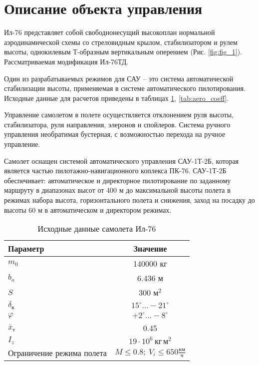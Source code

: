 \section{Описание объекта управления}

Ил-76 представляет собой свободнонесущий высокоплан нормальной аэродинамической
схемы со стреловидным крылом, стабилизатором и рулем высоты, однокилевым
Т-образным вертикальным оперением (Рис. \ref{fig:fig_1}). Рассматриваемая
модификация Ил-76ТД.

Один из разрабатываемых режимов для САУ -- это система автоматической
стабилизации высоты, применяемая в системе автоматического пилотирования.
Исходные данные для расчетов приведены в таблицах \ref{tab:data},
\ref{tab:aero_coeff}. 

Управление самолетом в полете осуществляется отклонением руля высоты,
стабилизатора, руля направления, элеронов и спойлеров. Система ручного
управления необратимая бустерная, с возможностью перехода на ручное управление. 

Самолет оснащен системой автоматического управления САУ-1Т-2Б, которая является
частью пилотажно-навигационного коплекса ПК-76. САУ-1Т-2Б обеспечивает:
автоматическое и директорное пилотирование по заданному маршруту в диапазонах
высот от 400 м до максимальной высоты полета в режимах набора высота,
горизонтального полета и снижения, заход на посадку до высоты 60 м в
автоматическом и директором режимах.

\begin{sidewaysfigure}
    \centering
    \caption{Общий вид самолета Ил-76}
    \label{fig:fig_1}
\end{sidewaysfigure}

\begin{table}[H]
    \centering
    \caption{Исходные данные самолета Ил-76}
    \label{tab:data}
    \begin{tabular}{|p{}|c|}
        \hline
        Параметр & Значение \\ 
        \hline
        $m_0$ & 140000 кг\\
        \hline
        $b_a$ & 6.436 м \\
        \hline
        $S$ & 300 $\text{м}^2$ \\
        \hline
        $ \delta_в$ & $15^\circ ... -21^\circ$\\
        \hline
        $\varphi$ & $ +2^\circ ... -8^\circ$ \\
        \hline
        $\bar{x}_\text{т}$ & 0.45 \\
        \hline
        $I_z$ & $ 19\cdot10^6 \ \text{кг}\,\text{м}^2$\\
        \hline
        Ограничение режима полета& $M \le 0.8; \ V_{i} \le 650 \frac{\text{км}}{ \text{ч}}$\\
        \hline
    \end{tabular}
\end{table}

